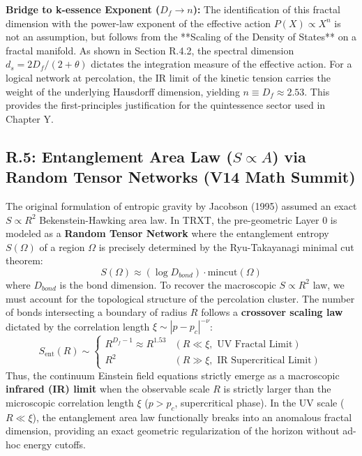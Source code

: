 \textbf{Bridge to k-essence Exponent ($D_f \to n$):}
The identification of this fractal dimension with the power-law exponent of the effective action $P(X) \propto X^{n}$ is not an assumption, but follows from the **Scaling of the Density of States** on a fractal manifold. As shown in Section R.4.2, the spectral dimension $d_s = 2 D_f / (2 + \theta)$ dictates the integration measure of the effective action. For a logical network at percolation, the IR limit of the kinetic tension carries the weight of the underlying Hausdorff dimension, yielding $n \equiv D_f \approx 2.53$. This provides the first-principles justification for the quintessence sector used in Chapter Y.

\subsection{R.5: Entanglement Area Law ($S \propto A$) via Random Tensor Networks (V14 Math Summit)}
\label{sec:entanglement_area_law}
The original formulation of entropic gravity by Jacobson (1995) assumed an exact $S \propto R^2$ Bekenstein-Hawking area law. In TRXT, the pre-geometric Layer 0 is modeled as a \textbf{Random Tensor Network} where the entanglement entropy $S(\Omega)$ of a region $\Omega$ is precisely determined by the Ryu-Takayanagi minimal cut theorem: 
\begin{equation}
    S(\Omega) \approx (\log D_{bond}) \cdot \text{mincut}(\Omega)
\end{equation}
where $D_{bond}$ is the bond dimension. To recover the macroscopic $S \propto R^2$ law, we must account for the topological structure of the percolation cluster. The number of bonds intersecting a boundary of radius $R$ follows a \textbf{crossover scaling law} dictated by the correlation length $\xi \sim |p - p_c|^{-\nu}$:
\begin{equation}
    S_{\text{ent}}(R) \sim 
    \begin{cases}
    R^{D_f - 1} \approx R^{1.53} & (R \ll \xi, \text{ UV Fractal Limit}) \\
    R^{2} & (R \gg \xi, \text{ IR Supercritical Limit})
    \end{cases}
\end{equation}
Thus, the continuum Einstein field equations strictly emerge as a macroscopic \textbf{infrared (IR) limit} when the observable scale $R$ is strictly larger than the microscopic correlation length $\xi$ ($p > p_c$, supercritical phase). In the UV scale ($R \ll \xi$), the entanglement area law functionally breaks into an anomalous fractal dimension, providing an exact geometric regularization of the horizon without ad-hoc energy cutoffs.

